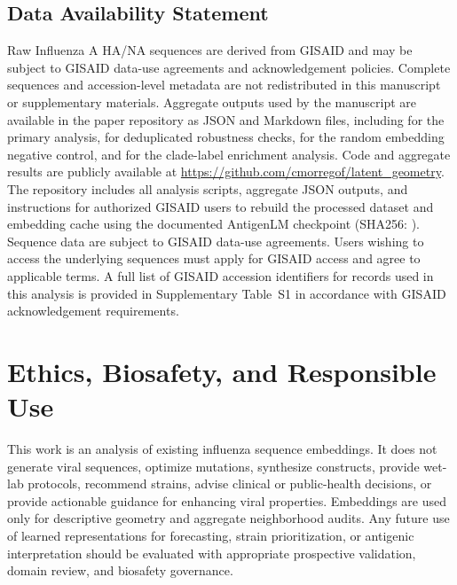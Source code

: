 \documentclass[11pt]{article}
\begin{document}
\subsection*{Data Availability Statement}

Raw Influenza A HA/NA sequences are derived from GISAID \cite{shu2017gisaid} and may be subject to GISAID data-use agreements and acknowledgement policies. Complete sequences and accession-level metadata are not redistributed in this manuscript or supplementary materials. Aggregate outputs used by the manuscript are available in the paper repository as JSON and Markdown files, including  for the primary analysis,  for deduplicated robustness checks,  for the random embedding negative control, and  for the clade-label enrichment analysis. Code and aggregate results are publicly available at \url{https://github.com/cmorregof/latent_geometry}. The repository includes all analysis scripts, aggregate JSON outputs, and instructions for authorized GISAID users to rebuild the processed dataset and embedding cache using the documented AntigenLM checkpoint (SHA256: ). Sequence data are subject to GISAID data-use agreements. Users wishing to access the underlying sequences must apply for GISAID access and agree to applicable terms. A full list of GISAID accession identifiers for records used in this analysis is provided in Supplementary Table~S1 in accordance with GISAID acknowledgement requirements.

\section{Ethics, Biosafety, and Responsible Use}

This work is an analysis of existing influenza sequence embeddings. It does not generate viral sequences, optimize mutations, synthesize constructs, provide wet-lab protocols, recommend strains, advise clinical or public-health decisions, or provide actionable guidance for enhancing viral properties. Embeddings are used only for descriptive geometry and aggregate neighborhood audits. Any future use of learned representations for forecasting, strain prioritization, or antigenic interpretation should be evaluated with appropriate prospective validation, domain review, and biosafety governance.
\end{document}
